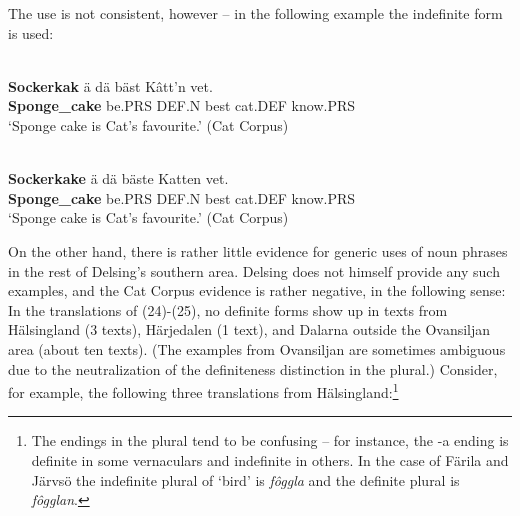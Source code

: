 

\ea
	\z 
\z

The use is not consistent, however – in the following example the indefinite form is used:



\ea\label{}
\\
\gll 	\textbf{Sockerkak} ä  dä  bäst  Kâtt’n  vet.\\
		\textbf{Sponge\_cake} be.PRS  DEF.N  best  cat.DEF  know.PRS\\
\glt ‘Sponge cake is Cat’s favourite.’ (Cat Corpus)

\z

\ea\label{}
\\
\gll 	\textbf{Sockerkake} ä  dä  bäste  Katten  vet.\\
		\textbf{Sponge\_cake} be.PRS  DEF.N  best  cat.DEF  know.PRS\\
\glt 	‘Sponge cake is Cat’s favourite.’ (Cat Corpus)

\z

On the other hand, there is rather little evidence for generic uses of noun phrases in the rest of Delsing’s southern area. Delsing does not himself provide any such examples, and the Cat Corpus evidence is rather negative, in the following sense: In the translations of (24){}-(25), no definite forms show up in texts from Hälsingland (3 texts), Härjedalen (1 text), and Dalarna outside the Ovansiljan area (about ten texts). (The examples from Ovansiljan are sometimes ambiguous due to the neutralization of the definiteness distinction in the plural.) Consider, for example, the following three translations from Hälsingland:\footnote{ The endings in the plural tend to be confusing – for instance, the -a ending is definite in some vernaculars and indefinite in others. In the case of Färila and Järvsö the indefinite plural of ‘bird’ is \textit{fôggla} and the definite plural is \textit{fôgglan}. }

